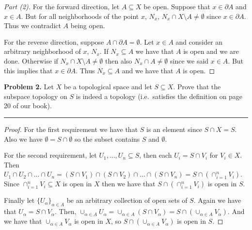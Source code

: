 \documentclass[leqno]{article}
\theoremstyle{nonumberplain}
\newtheorem{proof}{Proof}
\begin{document}
\begin{proof}[Part (2)]
For the forward direction, let $A\subseteq X$ be open. Suppose that $x\in \partial A$ and $x\in A$. But for all neighborhoods of the point $x$, $N_x$, $N_x\cap X\setminus A\neq \emptyset$ since $x\in \partial A$. Thus we contradict $A$ being open.

For the reverse direction, suppose $A\cap \partial A=\emptyset$. Let $x\in A$ and consider an arbitrary neighborhood of $x$, $N_x$. If $N_x\subseteq A$ we have that $A$ is open and we are done. Otherwise if $N_x\cap X\setminus A \neq \emptyset$ then also $N_x \cap A \neq \emptyset$ since we said $x\in A$. But this implies that $x\in \partial A$. Thus $N_x \subseteq A$ and we have that $A$ is open.
\end{proof}

\pagebreak



\noindent\textbf{Problem 2.} Let $X$ be a topological space and let $S\subseteq X$. Prove that the subspace topology on $S$ is indeed a topology (i.e.\ satisfies the definition on page 20 of our book).


\noindent\rule[0.5ex]{\linewidth}{1pt}

\begin{proof}
For the first requirement we have that $S$ is an element since $S\cap X=S$. Also we have $\emptyset = S\cap \emptyset$ so the subset contains $S$ and $\emptyset$.

For the second requirement, let $U_1,...,U_n\subseteq S$, then each $U_i=S\cap V_i$ for $V_i\in X$. Then $U_1\cap U_2 \cap ... \cap U_n=(S\cap V_1)\cap (S\cap V_2) \cap ... \cap (S\cap V_n)=S\cap (\cap_{i=1}^n V_i)$. Since $\cap_{i=1}^n V_i \subseteq X$ is open in $X$ then we have that $S\cap (\cap_{i=1}^n V_i)$ is open in $S$.

Finally let $\{U_\alpha\}_{\alpha \in A}$ be an arbitrary collection of open sets of $S$. Again we have that $U_\alpha=S\cap V_\alpha$. Then, $\cup_{\alpha\in A}U_\alpha = \cup_{\alpha\in A}(S\cap V_\alpha)=S\cap (\cup_{\alpha \in A} V_\alpha)$. And we have that $\cup_{\alpha \in A} V_\alpha$ is open in $X$, so $S\cap (\cup_{\alpha\in A} V_\alpha)$ is open in $S$. 
\end{proof}
\end{document}

